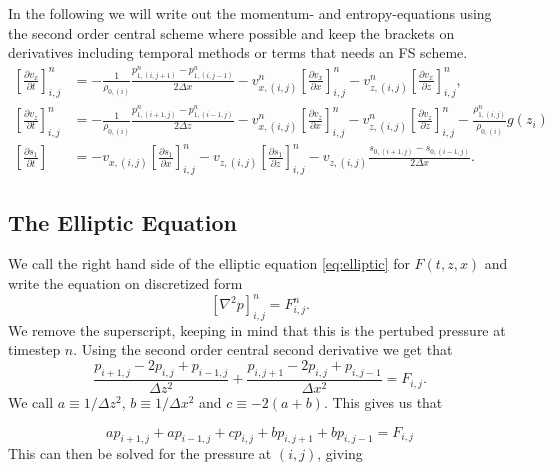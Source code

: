 In the following we will write out the momentum- and entropy-equations using the second order central scheme where possible and keep the brackets on derivatives including temporal methods or terms that needs an FS scheme.
\begin{align}
    \left[\frac{\partial v_x}{\partial t} \right]_{i,j}^n &= -\frac{1}{\rho_{0,(i)}}\frac{p_{1,(i,j+1)}^n - p_{1,(i,j-1)}^n}{2\Delta x} - v_{x,(i,j)}^n \left[\frac{\partial v_{x}}{\partial x}\right]_{i,j}^n - v_{z,(i,j)}^n \left[\frac{\partial v_{x}}{\partial z}\right]_{i,j}^n, \\
    \left[\frac{\partial v_z}{\partial t} \right]_{i,j}^n &= -\frac{1}{\rho_{0,(i)}}\frac{p_{1,(i+1,j)}^n - p_{1,(i-1,j)}^n}{2\Delta z} - v_{x,(i,j)}^n \left[\frac{\partial v_{z}}{\partial x}\right]_{i,j}^n - v_{z,(i,j)}^n \left[\frac{\partial v_{z}}{\partial z}\right]_{i,j}^n - \frac{\rho_{1,(i,j)}^n}{\rho_{0,(i)}}g(z_i)\\
    \left[\frac{\partial s_1}{\partial t}\right] &= - v_{x,(i,j)} \left[\frac{\partial s_1}{\partial x} \right]_{i,j}^n- v_{z,(i,j)} \left[\frac{\partial s_1}{\partial z} \right]_{i,j}^n - v_{z,(i,j)}\frac{s_{0,(i+1,j)}-s_{0,(i-1,j)}}{2\Delta x}. 
\end{align}

\subsection{The Elliptic Equation}

We call the right hand side of the elliptic equation \ref{eq:elliptic} for $F(t,z,x)$ and write the equation on discretized form
\begin{equation}
    \left[\nabla^2 p \right]_{i,j}^n = F_{i,j}^n.
\end{equation}
We remove the superscript, keeping in mind that this is the pertubed pressure at timestep $n$. Using the second order central second derivative we get that
\begin{equation}
    \frac{p_{i+1,j}-2p_{i,j}+p_{i-1,j}}{\Delta z^2} + \frac{p_{i,j+1}-2p_{i,j}+p_{i,j-1}}{\Delta x^2} = F_{i,j}.
\end{equation}
We call $a\equiv1/\Delta z^2$, $b\equiv1/\Delta x^2$ and $c\equiv-2(a+b)$. This gives us that

\begin{equation}
    ap_{i+1,j}+ap_{i-1,j}+cp_{i,j}+bp_{i,j+1}+bp_{i,j-1}=F_{i,j}
\end{equation}
This can then be solved for the pressure at $(i,j)$, giving

